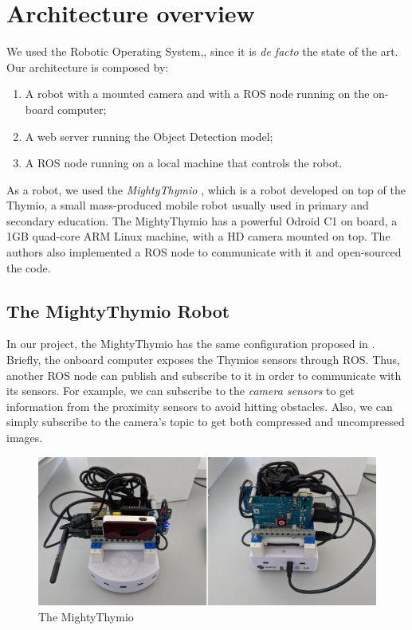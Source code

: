 \documentclass[letterpaper, 10 pt, conference]{ieeeconf}  %
\begin{document}
\section{Architecture overview}
We used the Robotic Operating System,\cite{ROS}, since it is \emph{de facto} the state of the art. Our architecture is composed by:
\begin{enumerate}
	\item A robot with a mounted camera and with a ROS node running on the on-board computer;
	\item A web server running the Object Detection model;
	\item A ROS node running on a local machine that controls the robot.
\end{enumerate}
As a robot, we used the \emph{MightyThymio} \cite{guzzi2018eaai}, which is a robot developed on top of the Thymio, a small mass-produced mobile robot usually used in primary and secondary education. The MightyThymio has a powerful Odroid C1 on board, a 1GB quad-core ARM Linux machine, with a HD camera mounted on top. The authors also implemented a ROS node to communicate with it and open-sourced the code.

\subsection*{The MightyThymio Robot}

In our project, the MightyThymio has the same configuration proposed in \cite{guzzi2018eaai}. Briefly, the onboard computer exposes the Thymios sensors through ROS. Thus, another ROS node can publish and subscribe to it in order to communicate with its sensors. For example, we can subscribe to the \emph{camera sensors} to get information from the proximity sensors to avoid hitting obstacles. Also, we can simply subscribe to the camera's topic to get both compressed and uncompressed images. 
\begin{figure}[H]
\centering
\includegraphics[width=\linewidth]{assembled_myt}	
\caption{The MightyThymio}
\end{figure}
\end{document}
